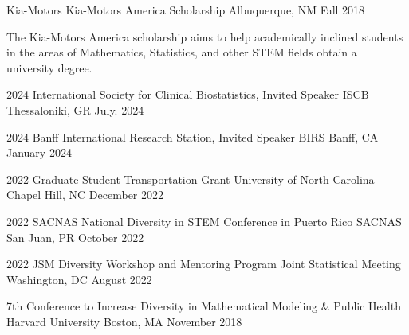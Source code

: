 \begin{cventries}

\cventry
{Kia-Motors} %
{Kia-Motors America Scholarship} %
{Albuquerque, NM} %
{Fall 2018} %
{
\begin{cvitems} %
\item The Kia-Motors America scholarship aims to help academically inclined students in the areas of Mathematics, Statistics, \newline and other STEM fields obtain a university degree.
  \end{cvitems}
}


\end{cventries}

{}

\begin{cvhonors}

  \cvhonor
    {2024 International Society for Clinical Biostatistics, Invited Speaker}
    {ISCB}
    {Thessaloniki, GR} %
    {July. 2024} %

  \cvhonor
    {2024 Banff International Research Station, Invited Speaker}
    {BIRS}
    {Banff, CA} %
    {January 2024} %


    \cvhonor
    {2022 Graduate Student Transportation Grant}
    {University of North Carolina}
    {Chapel Hill, NC} %
    {December 2022} %
    

  \cvhonor
    {2022 SACNAS National Diversity in STEM Conference in Puerto Rico}
    {SACNAS}
    {San Juan, PR} %
    {October 2022} %
    
  \cvhonor
    {2022 JSM Diversity Workshop and Mentoring Program}
    {Joint Statistical Meeting}
    {Washington, DC} %
    {August 2022} %

  \cvhonor
    {7th Conference to Increase Diversity in Mathematical Modeling \& Public Health}
    {Harvard University}
    {Boston, MA} %
    {November 2018} %

\end{cvhonors}


